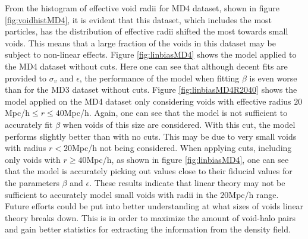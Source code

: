 From the histogram of effective void radii for MD4 dataset, shown in figure \ref{fig:voidhistMD4}, it is evident that this dataset, which includes the most particles, has the distribution of effective radii shifted the most towards small voids. This means that a large fraction of the voids in this dataset may be subject to non-linear effects. Figure \ref{fig:linbiasMD4} shows the model applied to the MD4 dataset without cuts. Here one can see that although decent fits are provided to $\sigma_v$ and $\epsilon$, the performance of the model when fitting $\beta$ is even worse than for the MD3 dataset without cuts. Figure \ref{fig:linbiasMD4R2040} shows the model applied on the MD4 dataset only considering voids with effective radius $20$Mpc/h$\leq r\leq 40$Mpc/h. Again, one can see that the model is not sufficient to accurately fit $\beta$ when voids of this size are considered. With this cut, the model performs slightly better than with no cuts. This may be due to very small voids with radius $r< 20$Mpc/h not being considered. When applying cuts, including only voids with $r\geq 40$Mpc/h, as shown in figure \ref{fig:linbiasMD4}, one can see that the model is accurately picking out values close to their fiducial values for the parameters $\beta$ and $\epsilon$. These results indicate that linear theory may not be sufficient to accurately model small voids with radii in the $20$Mpc/h range. Future efforts could be put into better understanding at what sizes of voids linear theory breaks down. This is in order to maximize the amount of void-halo pairs and gain better statistics for extracting the information from the density field.

